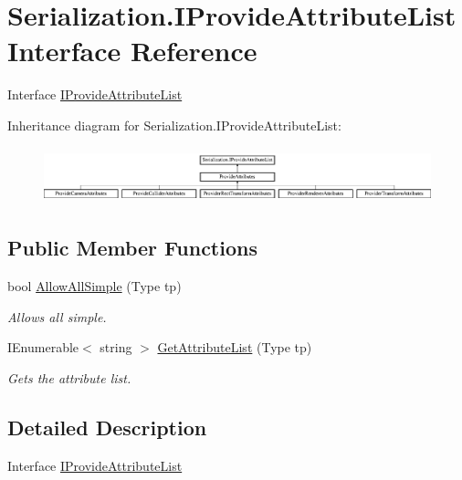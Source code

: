 \hypertarget{interface_serialization_1_1_i_provide_attribute_list}{}\section{Serialization.\+I\+Provide\+Attribute\+List Interface Reference}
\label{interface_serialization_1_1_i_provide_attribute_list}


Interface \hyperlink{interface_serialization_1_1_i_provide_attribute_list}{I\+Provide\+Attribute\+List}  


Inheritance diagram for Serialization.\+I\+Provide\+Attribute\+List\+:\begin{figure}[H]
\begin{center}
\leavevmode
\includegraphics[height=1.631068cm]{interface_serialization_1_1_i_provide_attribute_list}
\end{center}
\end{figure}
\subsection*{Public Member Functions}
\begin{DoxyCompactItemize}
\item 
bool \hyperlink{interface_serialization_1_1_i_provide_attribute_list_a67a8c176842f57fb928e68e87fdc4ade}{Allow\+All\+Simple} (Type tp)
\begin{DoxyCompactList}\small\item\em Allows all simple. \end{DoxyCompactList}\item 
I\+Enumerable$<$ string $>$ \hyperlink{interface_serialization_1_1_i_provide_attribute_list_afd95d460c41d4fddfb45b9e342557d01}{Get\+Attribute\+List} (Type tp)
\begin{DoxyCompactList}\small\item\em Gets the attribute list. \end{DoxyCompactList}\end{DoxyCompactItemize}


\subsection{Detailed Description}
Interface \hyperlink{interface_serialization_1_1_i_provide_attribute_list}{I\+Provide\+Attribute\+List} 




